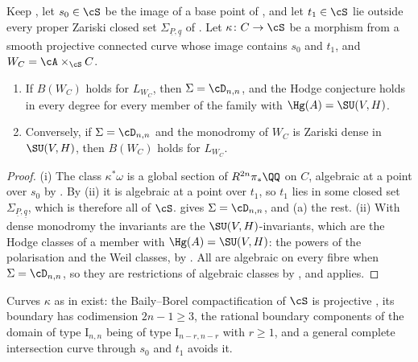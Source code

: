 \begin{corollary}
\label{cor:weilequiv}
Keep , let $s_{0}\in\cS$ be the image of a base point of
, and let $t_{1}\in\cS$ lie outside every proper
Zariski closed set $\Sigma_{\underline{P},\underline{q}}$ of
. Let $\kappa\colon C\to\cS$ be a morphism from a smooth
projective connected curve whose image contains $s_{0}$ and $t_{1}$, and
$W_{C}=\cA\times_{\cS}C$.
\begin{enumerate}[label=\textup{(\roman*)},leftmargin=2.6em,itemsep=2pt]
\item If $B(W_{C})$ holds for $L_{W_{C}}$, then $\Sigma=\cD_{n,n}$, and the
  Hodge conjecture holds in every degree for every member of the family with
  $\Hg(A)=\SU(V,H)$.
\item Conversely, if $\Sigma=\cD_{n,n}$ and the monodromy of $W_{C}$ is Zariski
  dense in $\SU(V,H)$, then $B(W_{C})$ holds for $L_{W_{C}}$.
\end{enumerate}
\end{corollary}

\begin{proof}
(i) The class $\kappa^{*}\omega$ is a global section of
$R^{2n}\pi_{*}\QQ$ on $C$, algebraic at a point over $s_{0}$ by
. By (ii) it is algebraic
at a point over $t_{1}$, so $t_{1}$ lies in some closed set
$\Sigma_{\underline{P},\underline{q}}$, which is therefore all of $\cS$.
 gives $\Sigma=\cD_{n,n}$, and (a)
the rest. (ii) With dense monodromy the invariants are the
$\SU(V,H)$-invariants, which are the Hodge classes of a member with
$\Hg(A)=\SU(V,H)$: the powers of the polarisation and the Weil classes, by
. All are algebraic on every fibre when
$\Sigma=\cD_{n,n}$, so they are restrictions of algebraic classes by
, and  applies.
\end{proof}

Curves $\kappa$ as in  exist: the Baily--Borel
compactification of $\cS$ is projective \cite{BB66}, its boundary has
codimension $2n-1\ge3$, the rational boundary components of the domain of type
$\mathrm{I}_{n,n}$ being of type $\mathrm{I}_{n-r,n-r}$ with $r\ge1$, and a
general complete intersection curve through $s_{0}$ and $t_{1}$ avoids it.

